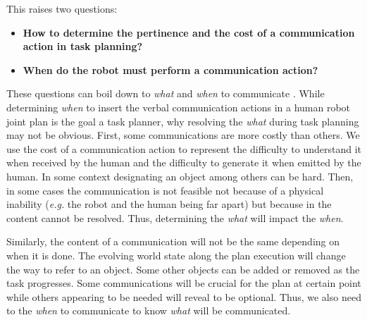 \documentclass[a4paper,11pt,twoside]{StyleThese}
\begin{document}
This raises two questions:
\begin{itemize}
\item \textbf{How to determine the pertinence and the cost of a communication action in task planning?}
\item \textbf{When do the robot must perform a communication action?}
\end{itemize}
These questions can boil down to \textit{what} and \textit{when} to communicate \cite{mavridis2015review}. While determining \textit{when} to insert the verbal communication actions in a human robot joint plan is the goal a task planner, why resolving the \textit{what} during task planning may not be obvious. First, some communications are more costly than others. We use the cost of a communication action to represent the difficulty to understand it when received by the human and the difficulty to generate it when emitted by the human. In some context designating an object among others can be hard. Then, in some cases the communication is not feasible not because of a physical inability (\textit{e.g.} the robot and the human being far apart) but because in the content cannot be resolved. Thus, determining the \textit{what} will impact the \textit{when}.

Similarly, the content of a communication will not be the same depending on when it is done. The evolving world state along the plan execution will change the way to refer to an object. Some other objects can be added or removed as the task progresses. Some communications will be crucial for the plan at certain point while others appearing to be needed will reveal to be optional. Thus, we also need to the \textit{when} to communicate to know \textit{what} will be communicated.
\end{document}
